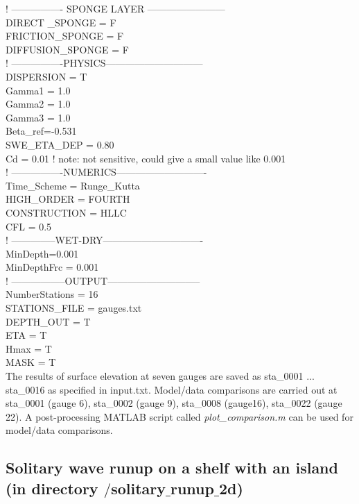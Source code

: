 \documentclass[11pt]{article}
\begin{document}
  ! ---------------- SPONGE LAYER ------------------------\\
DIRECT \_SPONGE = F\\
FRICTION\_SPONGE = F \\
DIFFUSION\_SPONGE = F \\

  ! ----------------PHYSICS------------------------------\\
DISPERSION = T\\
Gamma1 = 1.0\\
Gamma2 = 1.0\\
Gamma3 = 1.0\\
Beta\_ref=-0.531\\
SWE\_ETA\_DEP = 0.80\\
Cd = 0.01    ! note: not sensitive, could give a small value like 0.001\\

  ! ----------------NUMERICS----------------------------\\
Time\_Scheme = Runge\_Kutta\\
HIGH\_ORDER = FOURTH\\
CONSTRUCTION = HLLC\\
CFL = 0.5\\

  ! --------------WET-DRY-------------------------------\\
MinDepth=0.001\\
MinDepthFrc = 0.001\\

  ! -----------------OUTPUT-----------------------------\\
NumberStations = 16\\
STATIONS\_FILE = gauges.txt\\
DEPTH\_OUT = T\\
ETA = T\\
Hmax = T\\
MASK = T\\

The results of surface elevation at seven gauges are saved as sta\_0001 ... sta\_0016 as specified in input.txt. Model/data comparisons are carried out at sta\_0001 (gauge 6),  sta\_0002 (gauge 9),  sta\_0008 (gauge16),  sta\_0022 (gauge 22).
A post-processing MATLAB script called {\em plot\_comparison.m}  can be used for model/data comparisons.   

\subsection{Solitary wave runup on a shelf with an island  (in directory $/$solitary$\_$runup$\_$2d)}
\end{document}
